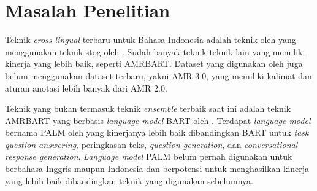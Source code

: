 \section{Masalah Penelitian}

Teknik \textit{cross-lingual} \amrparsing{} terbaru untuk Bahasa Indonesia adalah teknik oleh \textcite{putra2022} yang menggunakan teknik stog oleh .
Sudah banyak teknik-teknik lain yang memiliki kinerja \amrparsing{} yang lebih baik, seperti AMRBART.
Dataset yang digunakan oleh \textcite{putra2022} juga belum menggunakan dataset terbaru, yakni AMR 3.0, yang memiliki kalimat dan aturan anotasi lebih banyak dari AMR 2.0.

Teknik \amrparsing{} yang bukan termasuk teknik \textit{ensemble} terbaik saat ini adalah teknik AMRBART yang berbasis \textit{language model} BART oleh \textcite{lewis2020}.
Terdapat \textit{language model} bernama PALM oleh \textcite{bi2020} yang kinerjanya lebih baik dibandingkan BART untuk \textit{task} \textit{question-answering}, peringkasan teks, \textit{question generation}, dan \textit{conversational response generation}.
\textit{Language model} PALM belum pernah digunakan untuk \amrparsing{} berbahasa Inggris maupun Indonesia dan berpotensi untuk menghasilkan kinerja yang lebih baik dibandingkan teknik yang digunakan sebelumnya.

